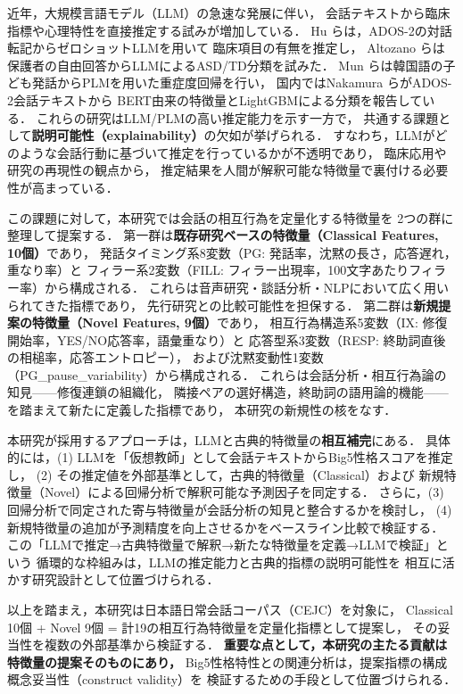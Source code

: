 \documentclass[dvipdfmx,11pt,a4paper]{bxjsarticle}
\begin{document}
近年，大規模言語モデル（LLM）の急速な発展に伴い，
会話テキストから臨床指標や心理特性を直接推定する試みが増加している．
Hu ら\cite{hu2025}は，ADOS-2の対話転記からゼロショットLLMを用いて
臨床項目の有無を推定し，
Altozano ら\cite{altozano2026}は保護者の自由回答からLLMによるASD/TD分類を試みた．
Mun ら\cite{mun2024}は韓国語の子ども発話からPLMを用いた重症度回帰を行い，
国内ではNakamura ら\cite{nakamura2025}がADOS-2会話テキストから
BERT由来の特徴量とLightGBMによる分類を報告している．
これらの研究はLLM/PLMの高い推定能力を示す一方で，
共通する課題として\textbf{説明可能性（explainability）}の欠如が挙げられる．
すなわち，LLMがどのような会話行動に基づいて推定を行っているかが不透明であり，
臨床応用や研究の再現性の観点から，
推定結果を人間が解釈可能な特徴量で裏付ける必要性が高まっている．

この課題に対して，本研究では会話の相互行為を定量化する特徴量を
2つの群に整理して提案する．
第一群は\textbf{既存研究ベースの特徴量（Classical Features, 10個）}であり，
発話タイミング系8変数（PG: 発話率，沈黙の長さ，応答遅れ，重なり率）と
フィラー系2変数（FILL: フィラー出現率，100文字あたりフィラー率）から構成される．
これらは音声研究・談話分析・NLPにおいて広く用いられてきた指標であり，
先行研究との比較可能性を担保する．
第二群は\textbf{新規提案の特徴量（Novel Features, 9個）}であり，
相互行為構造系5変数（IX: 修復開始率，YES/NO応答率，語彙重なり）と
応答型系3変数（RESP: 終助詞直後の相槌率，応答エントロピー），
および沈黙変動性1変数（PG\_pause\_variability）から構成される．
これらは会話分析・相互行為論の知見——修復連鎖の組織化，
隣接ペアの選好構造，終助詞の語用論的機能——を踏まえて新たに定義した指標であり，
本研究の新規性の核をなす．

本研究が採用するアプローチは，LLMと古典的特徴量の\textbf{相互補完}にある．
具体的には，(1) LLMを「仮想教師」として会話テキストからBig5性格スコアを推定し，
(2) その推定値を外部基準として，古典的特徴量（Classical）および
新規特徴量（Novel）による回帰分析で解釈可能な予測因子を同定する．
さらに，(3) 回帰分析で同定された寄与特徴量が会話分析の知見と整合するかを検討し，
(4) 新規特徴量の追加が予測精度を向上させるかをベースライン比較で検証する．
この「LLMで推定→古典特徴量で解釈→新たな特徴量を定義→LLMで検証」という
循環的な枠組みは，LLMの推定能力と古典的指標の説明可能性を
相互に活かす研究設計として位置づけられる．

以上を踏まえ，本研究は日本語日常会話コーパス（CEJC）を対象に，
Classical 10個 + Novel 9個 = 計19の相互行為特徴量を定量化指標として提案し，
その妥当性を複数の外部基準から検証する．
\textbf{重要な点として，本研究の主たる貢献は特徴量の提案そのものにあり，}
Big5性格特性との関連分析は，提案指標の構成概念妥当性（construct validity）を
検証するための手段として位置づけられる．
\end{document}
